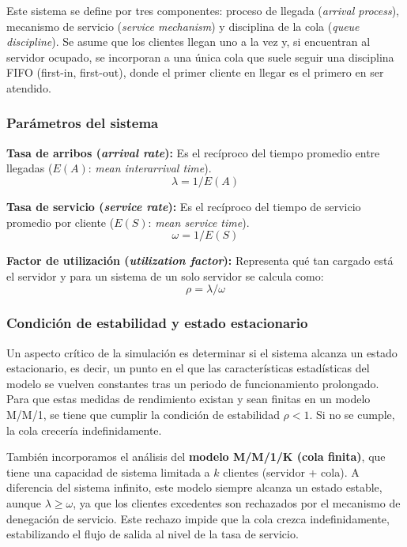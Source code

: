 \documentclass{article}
\begin{document}
Este sistema se define por tres componentes: proceso de llegada (\textit{arrival process}), mecanismo de servicio (\textit{service mechanism}) y disciplina de la cola (\textit{queue discipline}). Se asume que los clientes llegan uno a la vez y, si encuentran al servidor ocupado, se incorporan a una única cola que suele seguir una disciplina FIFO (first-in, first-out), donde el primer cliente en llegar es el primero en ser atendido.

\subsubsection{Parámetros del sistema}
\textbf{Tasa de arribos (\textit{arrival rate}):} Es el recíproco del tiempo promedio entre llegadas ($E(A)$: \textit{mean interarrival time}).
\begin{equation}
\lambda = 1/E(A)
\end{equation}

\textbf{Tasa de servicio (\textit{service rate}):} Es el recíproco del tiempo de servicio promedio por cliente ($E(S)$: \textit{mean service time}).
\begin{equation}
\omega = 1/E(S)
\end{equation}

\textbf{Factor de utilización (\textit{utilization factor}):} Representa qué tan cargado está el servidor y para un sistema de un solo servidor se calcula como:
\begin{equation}
\rho = \lambda / \omega
\end{equation}

\subsubsection{Condición de estabilidad y estado estacionario}
Un aspecto crítico de la simulación es determinar si el sistema alcanza un estado estacionario, es decir, un punto en el que las características estadísticas del modelo se vuelven constantes tras un periodo de funcionamiento prolongado. Para que estas medidas de rendimiento existan y sean finitas en un modelo M/M/1, se tiene que cumplir la condición de estabilidad $\rho < 1$. Si no se cumple, la cola crecería indefinidamente.

También incorporamos el análisis del \textbf{modelo M/M/1/K (cola finita)}, que tiene una capacidad de sistema limitada a $k$ clientes (servidor + cola). A diferencia del sistema infinito, este modelo siempre alcanza un estado estable, aunque $\lambda \geq \omega$, ya que los clientes excedentes son rechazados por el mecanismo de denegación de servicio. Este rechazo impide que la cola crezca indefinidamente, estabilizando el flujo de salida al nivel de la tasa de servicio.
\end{document}
